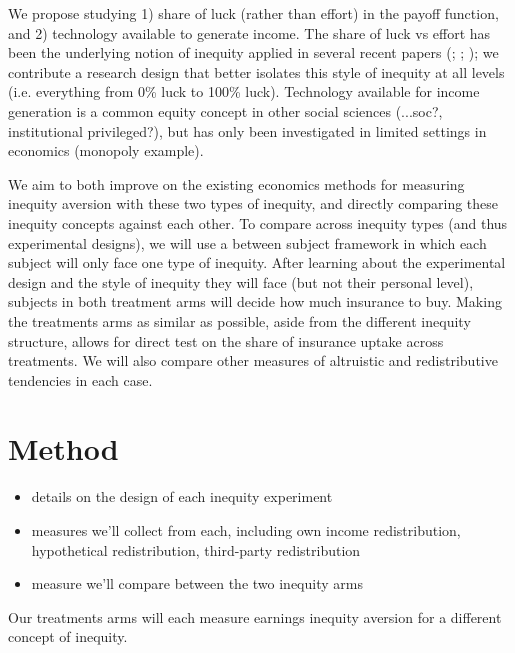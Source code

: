 \documentclass[12pt, a4paper]{article}
\begin{document}
We propose studying 1) share of luck (rather than effort) in the payoff function, and 2) technology available to generate income. The share of luck vs effort has been the underlying notion of inequity applied in several recent papers (\citealp{Alensina_Di_Tella_MacCulloch_JPub2004}; \citealp{Erkal_Gangadharan_Nikiforakis_AER2011}; \citealp{Lefgren_Sims_Stoddard}); we contribute a research design that better isolates this style of inequity at all levels (i.e. everything from 0\% luck to 100\% luck). Technology available for income generation is a common equity concept in other social sciences (...soc?, institutional privileged?), but has only been investigated in limited settings in economics (monopoly example).

We aim to both improve on the existing economics methods for measuring inequity aversion with these two types of inequity, and directly comparing these inequity concepts against each other. To compare across inequity types (and thus experimental designs), we will use a between subject framework in which each subject will only face one type of inequity. After learning about the experimental design and the style of inequity they will face (but not their personal level), subjects in both treatment arms will decide how much insurance to buy. Making the treatments arms as similar as possible, aside from the different inequity structure, allows for direct test on the share of insurance uptake across treatments. We will also compare other measures of altruistic and redistributive tendencies in each case.

\section*{Method}

\begin{itemize}
\item details on the design of each inequity experiment
\item measures we'll collect from each, including own income redistribution, hypothetical redistribution, third-party redistribution 
\item measure we'll compare between the two inequity arms
\end{itemize}

Our treatments arms will each measure earnings inequity aversion for a different concept of inequity.
\end{document}
